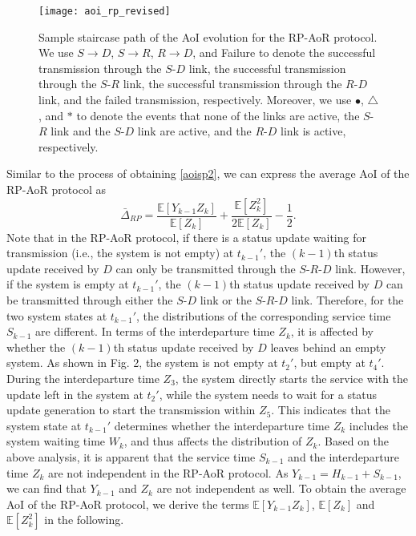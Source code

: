 \documentclass{IEEEtran}
\begin{document}
\begin{figure}
	\centering
	\texttt{[image: aoi\_rp\_revised]}
	\caption{Sample staircase path of the AoI evolution for the RP-AoR protocol. We use $S\!\rightarrow\! D$, $S\!\rightarrow\! R$, $R\!\rightarrow\! D$, and Failure to denote the successful transmission through the $S$-$D$ link, the successful transmission through the $S$-$R$ link, the successful transmission through the $R$-$D$ link, and the failed transmission, respectively. Moreover, we use $\bullet$, {\scriptsize{$\triangle$}}, and $*$ to denote the events that none of the links are active, the $S$-$R$ link and the $S$-$D$ link are active, and the $R$-$D$ link is active, respectively.}
	\label{fig:aoirp}
	\vspace{-0.4cm}
\end{figure}


Similar to the process of obtaining \eqref{aoisp2}, we can express the average AoI of the RP-AoR protocol as 
\begin{equation}\label{aoirp1}
\bar{\Delta}_{RP}=\frac{\mathbb{E}[Y_{k-1}Z_{k}]}{\mathbb{E}[Z_{k}]}+\frac{\mathbb{E}[Z_{k}^2]}{2\mathbb{E}[Z_{k}]}-\frac{1}{2}.
\end{equation}
Note that in the RP-AoR protocol, if there is a status update waiting for transmission (i.e., the system is not empty) at $t_{k-1}'$, the $(k-1)$th status update received by $D$ can only be transmitted through the $S$-$R$-$D$ link.
However, if the system is empty at $t_{k-1}'$, the $(k-1)$th status update received by $D$ can be transmitted through either the $S$-$D$ link or the $S$-$R$-$D$ link. Therefore, for the two system states at $t_{k-1}'$, the distributions of the corresponding service time $S_{k-1}$ are different. In terms of the interdeparture time $Z_k$, it is affected by whether the $(k-1)$th status update received by $D$ leaves behind an empty system. As shown in Fig. 2, the system is not empty at $t_2'$, but empty at $t_4'$. During the interdeparture time $Z_3$, the system directly starts the service with the update left in the system at $t_2'$, while the system needs to wait for a status update generation to start the transmission within $Z_5$. This indicates that the system state at $t_{k-1}'$ determines whether the interdeparture time $Z_k$ includes the system waiting time $W_k$, and thus affects the distribution of $Z_k$. Based on the above analysis, it is apparent that the service time $S_{k-1}$ and the interdeparture time $Z_k$ are not independent in the RP-AoR protocol. As $Y_{k-1}=H_{k-1}+S_{k-1}$, we can find that $Y_{k-1}$ and $Z_k$ are not independent as well. To obtain the average AoI of the RP-AoR protocol, we derive the terms $\mathbb{E}[Y_{k-1}Z_{k}]$, $\mathbb{E}[Z_k]$ and $\mathbb{E}[Z_k^2]$ in the following. 
\end{document}
